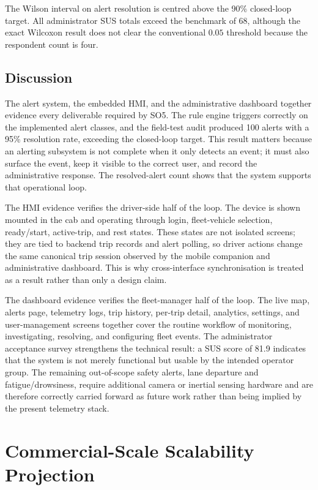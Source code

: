 The Wilson interval on alert resolution is centred above the 90\% closed-loop target. All administrator SUS totals exceed the benchmark of 68, although the exact Wilcoxon result does not clear the conventional $0.05$ threshold because the respondent count is four.

\FloatBarrier
\subsection{Discussion}
The alert system, the embedded HMI, and the administrative dashboard together evidence every deliverable required by SO5. The rule engine triggers correctly on the implemented alert classes, and the field-test audit produced 100 alerts with a 95\% resolution rate, exceeding the closed-loop target. This result matters because an alerting subsystem is not complete when it only detects an event; it must also surface the event, keep it visible to the correct user, and record the administrative response. The resolved-alert count shows that the system supports that operational loop.

The HMI evidence verifies the driver-side half of the loop. The device is shown mounted in the cab and operating through login, fleet-vehicle selection, ready/start, active-trip, and rest states. These states are not isolated screens; they are tied to backend trip records and alert polling, so driver actions change the same canonical trip session observed by the mobile companion and administrative dashboard. This is why cross-interface synchronisation is treated as a result rather than only a design claim.

The dashboard evidence verifies the fleet-manager half of the loop. The live map, alerts page, telemetry logs, trip history, per-trip detail, analytics, settings, and user-management screens together cover the routine workflow of monitoring, investigating, resolving, and configuring fleet events. The administrator acceptance survey strengthens the technical result: a SUS score of 81.9 indicates that the system is not merely functional but usable by the intended operator group. The remaining out-of-scope safety alerts, lane departure and fatigue/drowsiness, require additional camera or inertial sensing hardware and are therefore correctly carried forward as future work rather than being implied by the present telemetry stack.


\section{Commercial-Scale Scalability Projection}
\label{sec:so_commercial_scalability}

